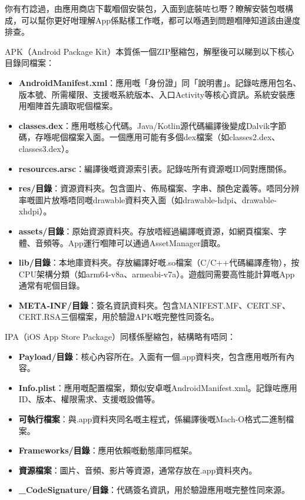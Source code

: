 
你有冇諗過，由應用商店下載嗰個安裝包，入面到底裝咗乜嘢？瞭解安裝包嘅構成，可以幫你更好咁理解App係點樣工作嘅，都可以喺遇到問題嗰陣知道該由邊度排查。


APK（Android Package Kit）本質係一個ZIP壓縮包，解壓後可以睇到以下核心目錄同檔案：

\begin{itemize}
  \item \textbf{AndroidManifest.xml}：應用嘅「身份證」同「說明書」。記錄咗應用包名、版本號、所需權限、支援嘅系統版本、入口Activity等核心資訊。系統安裝應用嗰陣首先讀取呢個檔案。
  \item \textbf{classes.dex}：應用嘅核心代碼。Java/Kotlin源代碼編譯後變成Dalvik字節碼，存喺呢個檔案入面。一個應用可能有多個dex檔案（如classes2.dex、classes3.dex）。
  \item \textbf{resources.arsc}：編譯後嘅資源索引表。記錄咗所有資源嘅ID同對應關係。
  \item \textbf{res/目錄}：資源資料夾。包含圖片、佈局檔案、字串、顏色定義等。唔同分辨率嘅圖片放喺唔同嘅drawable資料夾入面（如drawable-hdpi、drawable-xhdpi）。
  \item \textbf{assets/目錄}：原始資源資料夾。存放唔經過編譯嘅資源，如網頁檔案、字體、音頻等。App運行嗰陣可以通過AssetManager讀取。
  \item \textbf{lib/目錄}：本地庫資料夾。存放編譯好嘅.so檔案（C/C++代碼編譯產物），按CPU架構分類（如arm64-v8a、armeabi-v7a）。遊戲同需要高性能計算嘅App通常有呢個目錄。
  \item \textbf{META-INF/目錄}：簽名資訊資料夾。包含MANIFEST.MF、CERT.SF、CERT.RSA三個檔案，用於驗證APK嘅完整性同簽名。
\end{itemize}


IPA（iOS App Store Package）同樣係壓縮包，結構略有唔同：

\begin{itemize}
  \item \textbf{Payload/目錄}：核心內容所在。入面有一個.app資料夾，包含應用嘅所有內容。
  \item \textbf{Info.plist}：應用嘅配置檔案，類似安卓嘅AndroidManifest.xml。記錄咗應用ID、版本、權限需求、支援嘅設備等。
  \item \textbf{可執行檔案}：與.app資料夾同名嘅主程式，係編譯後嘅Mach-O格式二進制檔案。
  \item \textbf{Frameworks/目錄}：應用依賴嘅動態庫同框架。
  \item \textbf{資源檔案}：圖片、音頻、影片等資源，通常存放在.app資料夾內。
  \item \textbf{\_CodeSignature/目錄}：代碼簽名資訊，用於驗證應用嘅完整性同來源。
\end{itemize}

